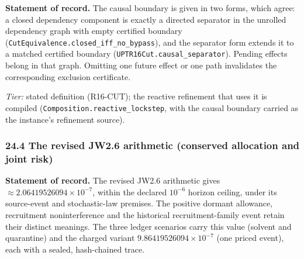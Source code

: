 \documentclass[
]{article}
\begin{document}
\textbf{Statement of record.} The causal boundary is given in two forms,
which agree: a closed dependency component is exactly a directed
separator in the unrolled dependency graph with empty certified boundary
(\texttt{C\allowbreak{}u\allowbreak{}t\allowbreak{}E\allowbreak{}q\allowbreak{}u\allowbreak{}i\allowbreak{}v\allowbreak{}a\allowbreak{}l\allowbreak{}e\allowbreak{}n\allowbreak{}c\allowbreak{}e\allowbreak{}.\allowbreak{}c\allowbreak{}l\allowbreak{}o\allowbreak{}s\allowbreak{}e\allowbreak{}d\allowbreak{}\_\allowbreak{}i\allowbreak{}f\allowbreak{}f\allowbreak{}\_\allowbreak{}n\allowbreak{}o\allowbreak{}\_\allowbreak{}b\allowbreak{}y\allowbreak{}p\allowbreak{}a\allowbreak{}s\allowbreak{}s}),
and the separator form extends it to a matched certified boundary
(\texttt{U\allowbreak{}P\allowbreak{}T\allowbreak{}R\allowbreak{}1\allowbreak{}6\allowbreak{}C\allowbreak{}u\allowbreak{}t\allowbreak{}.\allowbreak{}c\allowbreak{}a\allowbreak{}u\allowbreak{}s\allowbreak{}a\allowbreak{}l\allowbreak{}\_\allowbreak{}s\allowbreak{}e\allowbreak{}p\allowbreak{}a\allowbreak{}r\allowbreak{}a\allowbreak{}t\allowbreak{}o\allowbreak{}r}).
Pending effects belong in that graph. Omitting one future effect or one
path invalidates the corresponding exclusion certificate.

\emph{Tier:} stated definition (R16-CUT); the reactive refinement that
uses it is compiled
(\texttt{C\allowbreak{}o\allowbreak{}m\allowbreak{}p\allowbreak{}o\allowbreak{}s\allowbreak{}i\allowbreak{}t\allowbreak{}i\allowbreak{}o\allowbreak{}n\allowbreak{}.\allowbreak{}r\allowbreak{}e\allowbreak{}a\allowbreak{}c\allowbreak{}t\allowbreak{}i\allowbreak{}v\allowbreak{}e\allowbreak{}\_\allowbreak{}l\allowbreak{}o\allowbreak{}c\allowbreak{}k\allowbreak{}s\allowbreak{}t\allowbreak{}e\allowbreak{}p},
with the causal boundary carried as the instance's refinement source).

\subsubsection{24.4 The revised JW2.6 arithmetic (conserved allocation
and joint
risk)}\label{the-revised-jw2.6-arithmetic-conserved-allocation-and-joint-risk}

\textbf{Statement of record.} The revised JW2.6 arithmetic gives
\(\approx 2.06419526094 \times 10^{-7}\), within the declared
\(10^{-6}\) horizon ceiling, under its source-event and stochastic-law
premises. The positive dormant allowance, recruitment noninterference
and the historical recruitment-family event retain their distinct
meanings. The three ledger scenarios carry this value (solvent and
quarantine) and the charged variant \(9.86419526094 \times 10^{-7}\)
(one priced event), each with a sealed, hash-chained trace.
\end{document}
